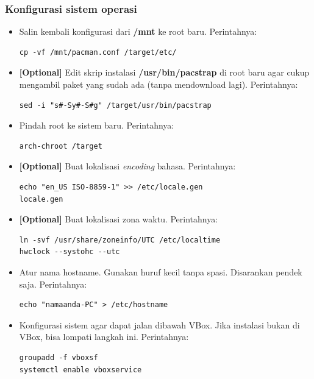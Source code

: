 \documentclass[12pt,]{article}
\begin{document}
	\subsubsection{Konfigurasi sistem operasi}
	\begin{itemize}
		\item Salin kembali konfigurasi dari \textbf{/mnt} ke root baru.
		Perintahnya:
		\begin{verbatim}
cp -vf /mnt/pacman.conf /target/etc/
		\end{verbatim}

		\item \textbf{[Optional]} Edit skrip instalasi \textbf{/usr/bin/pacstrap} di root baru agar cukup mengambil paket yang sudah ada (tanpa mendownload lagi).
		Perintahnya:
		\begin{verbatim}
sed -i "s#-Sy#-S#g" /target/usr/bin/pacstrap
		\end{verbatim}

		\item Pindah root ke sistem baru.
		Perintahnya:
		\begin{verbatim}
arch-chroot /target
		\end{verbatim}

		\item \textbf{[Optional]} Buat lokalisasi \textit{encoding} bahasa.
		Perintahnya:
		\begin{verbatim}
echo "en_US ISO-8859-1" >> /etc/locale.gen
locale.gen
		\end{verbatim}

		\item \textbf{[Optional]} Buat lokalisasi zona waktu.
		Perintahnya:
		\begin{verbatim}
ln -svf /usr/share/zoneinfo/UTC /etc/localtime
hwclock --systohc --utc
		\end{verbatim}

		\item Atur nama hostname. Gunakan huruf kecil tanpa spasi.
		Disarankan pendek saja.
		Perintahnya:
		\begin{verbatim}
echo "namaanda-PC" > /etc/hostname
		\end{verbatim}

		\item Konfigurasi sistem agar dapat jalan dibawah VBox.
		Jika instalasi bukan di VBox, bisa lompati langkah ini.
		Perintahnya:
		\begin{verbatim}
groupadd -f vboxsf
systemctl enable vboxservice
		\end{verbatim}


\end{itemize}
\end{document}
